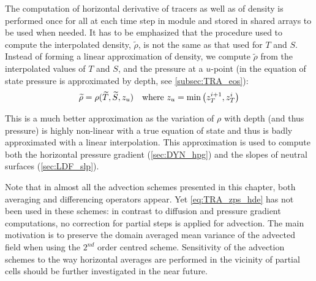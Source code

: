 \documentclass[../main/NEMO_manual]{subfiles}
\begin{document}
The computation of horizontal derivative of tracers as well as of density is performed once for all at
each time step in  module and stored in shared arrays to be used when needed.
It has to be emphasized that the procedure used to compute the interpolated density,
$\widetilde \rho$, is not the same as that used for $T$ and $S$.
Instead of forming a linear approximation of density,
we compute $\widetilde \rho$ from the interpolated values of $T$ and $S$,
and the pressure at a $u$-point
(in the equation of state pressure is approximated by depth, see \autoref{subsec:TRA_eos}):
\[
  \widetilde \rho = \rho (\widetilde T,\widetilde S,z_u) \quad \text{where~} z_u = \min \left( z_T^{i + 1},z_T^i \right)
\]

This is a much better approximation as the variation of $\rho$ with depth (and thus pressure)
is highly non-linear with a true equation of state and thus is badly approximated with
a linear interpolation.
This approximation is used to compute both the horizontal pressure gradient (\autoref{sec:DYN_hpg})
and the slopes of neutral surfaces (\autoref{sec:LDF_slp}).

Note that in almost all the advection schemes presented in this chapter,
both averaging and differencing operators appear.
Yet \autoref{eq:TRA_zps_hde} has not been used in these schemes:
in contrast to diffusion and pressure gradient computations,
no correction for partial steps is applied for advection.
The main motivation is to preserve the domain averaged mean variance of the advected field when
using the $2^{nd}$ order centred scheme.
Sensitivity of the advection schemes to the way horizontal averages are performed in
the vicinity of partial cells should be further investigated in the near future.

\subinc{}
\end{document}

